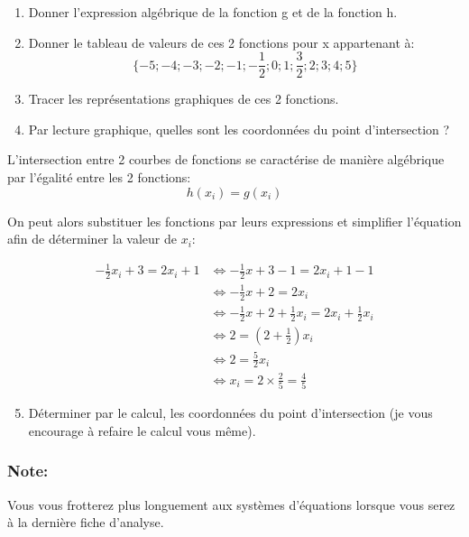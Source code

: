 \documentclass[11pt, french]{article}
\begin{document}
\begin{enumerate}
    \item  Donner l'expression algébrique de la fonction g et de la fonction h.
    \item  Donner le tableau de valeurs de ces 2 fonctions pour x appartenant à:
    $$
    \{-5; -4; -3; -2; -1; -\frac{1}{2}; 0; 1; \frac{3}{2}; 2; 3; 4; 5\}
    $$
    \item  Tracer les représentations graphiques de ces 2 fonctions.
    \item  Par lecture graphique, quelles sont les coordonnées du point d'intersection ?
\end{enumerate}

L'intersection entre 2 courbes de fonctions se caractérise de manière algébrique par l'égalité entre les 2 fonctions:
\begin{equation}\nonumber
h(x_i) = g(x_i)
\end{equation}

On peut alors substituer les fonctions par leurs expressions et simplifier l'équation afin de déterminer la valeur de $x_i$:

\begin{align}
-\frac{1}{2}x_i+3 = 2x_i+1 & \Leftrightarrow -\frac{1}{2}x + 3 -1 = 2x_i + 1 -1 \nonumber\\
& \Leftrightarrow -\frac{1}{2}x + 2 = 2x_i \nonumber\\
& \Leftrightarrow -\frac{1}{2}x + 2 + \frac{1}{2}x_i = 2x_i + \frac{1}{2}x_i \nonumber\\
& \Leftrightarrow 2 = (2+\frac{1}{2})x_i \nonumber\\
& \Leftrightarrow 2 = \frac{5}{2}x_i \nonumber\\
& \Leftrightarrow x_i = 2\times \frac{2}{5} = \frac{4}{5} \nonumber
\end{align}

\begin{enumerate}
    \setcounter{enumi}{4}
    \item Déterminer par le calcul, les coordonnées du point d'intersection (je vous encourage à refaire le calcul vous même).
\end{enumerate}

\subsubsection*{Note:}
Vous vous frotterez plus longuement aux systèmes d'équations lorsque vous serez à la dernière fiche d'analyse.
\vspace{3cm}
\end{document}
